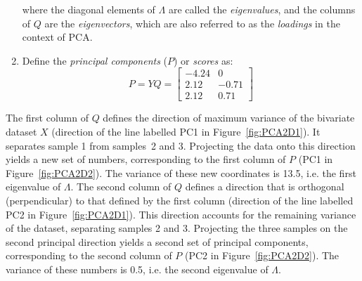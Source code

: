 \begin{enumerate}
  where the diagonal elements of $\Lambda$ are called the
  \emph{eigenvalues}, and the columns of $Q$ are the
  \emph{eigenvectors}, which are also referred to as the
  \emph{loadings} in the context of PCA.

\item Define the \emph{principal components} ($P$) or \emph{scores}
  as:
  \begin{equation}
    P = Y Q = 
    \left[
      \begin{array}{cc}
        -4.24 & 0 \\
        2.12 & -0.71 \\
        2.12 & 0.71
      \end{array}
      \right]
    \label{eq:P}
  \end{equation}

\end{enumerate}

The first column of $Q$ defines the direction of maximum variance of
the bivariate dataset $X$ (direction of the line labelled PC1 in
Figure~\ref{fig:PCA2D1}).  It separates sample 1 from samples~2 and
3. Projecting the data onto this direction yields a new set of
numbers, corresponding to the first column of $P$ (PC1 in
Figure~\ref{fig:PCA2D2}). The variance of these new coordinates is
13.5, i.e. the first eigenvalue of $\Lambda$. The second column of $Q$
defines a direction that is orthogonal (perpendicular) to that defined
by the first column (direction of the line labelled PC2 in
Figure~\ref{fig:PCA2D1}). This direction accounts for the remaining
variance of the dataset, separating samples 2 and 3. Projecting the
three samples on the second principal direction yields a second set of
principal components, corresponding to the second column of $P$ (PC2
in Figure~\ref{fig:PCA2D2}). The variance of these numbers is 0.5,
i.e. the second eigenvalue of $\Lambda$.

